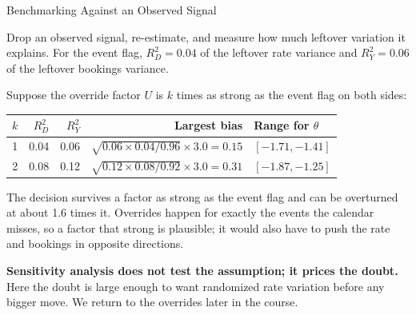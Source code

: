\documentclass[aspectratio=169, 11pt, handout]{beamer}
\begin{document}
\begin{frame}{Benchmarking Against an Observed Signal}

Drop an observed signal, re-estimate, and measure how much leftover variation it explains. For the event flag, $R^2_D = 0.04$ of the leftover rate variance and $R^2_Y = 0.06$ of the leftover bookings variance.

\medskip

Suppose the override factor $U$ is $k$ times as strong as the event flag on both sides:
\begin{center}
\small
\begin{tabular}{rrrrl}
\toprule
$k$ & $R^2_D$ & $R^2_Y$ & \textbf{Largest bias} & \textbf{Range for $\theta$} \\
\midrule
1 & 0.04 & 0.06 & $\sqrt{0.06 \times 0.04/0.96} \times 3.0 = 0.15$ & $[-1.71, -1.41]$ \\
2 & 0.08 & 0.12 & $\sqrt{0.12 \times 0.08/0.92} \times 3.0 = 0.31$ & \textcolor{warnred}{$[-1.87, -1.25]$} \\
\bottomrule
\end{tabular}
\end{center}

\medskip

The decision survives a factor as strong as the event flag and can be overturned at about 1.6 times it. Overrides happen for exactly the events the calendar misses, so a factor that strong is plausible; it would also have to push the rate and bookings in opposite directions.

\medskip

\textbf{Sensitivity analysis does not test the assumption; it prices the doubt.} Here the doubt is large enough to want randomized rate variation before any bigger move. We return to the overrides later in the course.
\end{frame}
\end{document}
